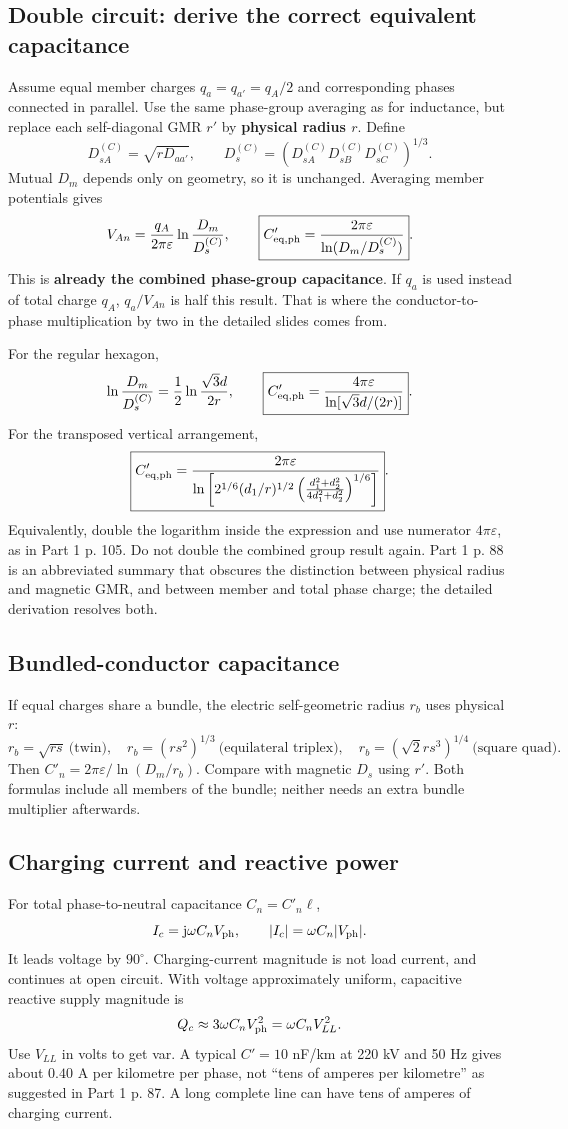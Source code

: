 \documentclass[11pt,a4paper]{article}
\newcommand{\ans}[1]{\boxed{#1}}
\newcommand{\jj}{\mathrm j}
\begin{document}
\subsection{Double circuit: derive the correct equivalent capacitance}
Assume equal member charges $q_a=q_{a'}=q_A/2$ and corresponding phases connected in parallel. Use the same phase-group averaging as for inductance, but replace each self-diagonal GMR $r'$ by \textbf{physical radius $r$}. Define
\[
 D^{(C)}_{sA}=\sqrt{rD_{aa'}},\qquad
 D^{(C)}_s=(D^{(C)}_{sA}D^{(C)}_{sB}D^{(C)}_{sC})^{1/3}.
\]
Mutual $D_m$ depends only on geometry, so it is unchanged. Averaging member potentials gives
\[
 V_{An}=\frac{q_A}{2\pi\varepsilon}\ln\frac{D_m}{D^{(C)}_s},\qquad
 \ans{C'_{\rm eq,ph}=\frac{2\pi\varepsilon}{\ln(D_m/D^{(C)}_s)}}.
\]
This is \textbf{already the combined phase-group capacitance}. If $q_a$ is used instead of total charge $q_A$, $q_a/V_{An}$ is half this result. That is where the conductor-to-phase multiplication by two in the detailed slides comes from.

For the regular hexagon,
\[
 \ln\frac{D_m}{D_s^{(C)}}=\frac12\ln\frac{\sqrt3d}{2r},\qquad
 \ans{C'_{\rm eq,ph}=\frac{4\pi\varepsilon}{\ln[\sqrt3d/(2r)]}}.
\]
For the transposed vertical arrangement,
\[
 \ans{C'_{\rm eq,ph}=\frac{2\pi\varepsilon}{
 \ln\left[2^{1/6}(d_1/r)^{1/2}
 \left(\frac{d_1^2+d_2^2}{4d_1^2+d_2^2}\right)^{1/6}\right]}}.
\]
Equivalently, double the logarithm inside the expression and use numerator $4\pi\varepsilon$, as in Part 1 p. 105. Do not double the combined group result again. Part 1 p. 88 is an abbreviated summary that obscures the distinction between physical radius and magnetic GMR, and between member and total phase charge; the detailed derivation resolves both.
\subsection{Bundled-conductor capacitance}
If equal charges share a bundle, the electric self-geometric radius $r_b$ uses physical $r$:
\[
 r_b=\sqrt{rs}\ \text{(twin)},\quad
 r_b=(rs^2)^{1/3}\ \text{(equilateral triplex)},\quad
 r_b=(\sqrt2rs^3)^{1/4}\ \text{(square quad)}.
\]
Then $C'_n=2\pi\varepsilon/\ln(D_m/r_b)$. Compare with magnetic $D_s$ using $r'$. Both formulas include all members of the bundle; neither needs an extra bundle multiplier afterwards.
\subsection{Charging current and reactive power}
For total phase-to-neutral capacitance $C_n=C'_n\ell$,
\[
 I_c=\jj\omega C_nV_{\rm ph},\qquad |I_c|=\omega C_n|V_{\rm ph}|.
\]
It leads voltage by $90^\circ$. Charging-current magnitude is not load current, and continues at open circuit. With voltage approximately uniform, capacitive reactive supply magnitude is
\[
 Q_c\approx3\omega C_nV_{\rm ph}^2=\omega C_nV_{LL}^2.
\]
Use $V_{LL}$ in volts to get var. A typical $C'=10$ nF/km at 220 kV and 50 Hz gives about $0.40$ A per kilometre per phase, not ``tens of amperes per kilometre'' as suggested in Part 1 p. 87. A long complete line can have tens of amperes of charging current.
\end{document}
